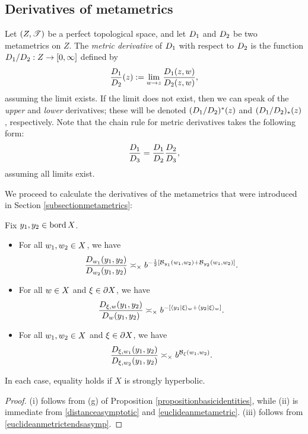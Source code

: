 \subsection{Derivatives of metametrics}

Let $(Z,\mathscr T)$ be a perfect topological space, and let $D_1$ and $D_2$ be two metametrics on $Z$. The \emph{metric derivative} of $D_1$ with respect to $D_2$ is the function $D_1/D_2:Z\to[0,\infty]$ defined by
\[
\frac{D_1}{D_2}(z) := \lim_{w\to z}\frac{D_1(z,w)}{D_2(z,w)},
\]
assuming the limit exists. If the limit does not exist, then we can speak of the \emph{upper} and \emph{lower} derivatives; these will be denoted $(D_1/D_2)^*(z)$ and $(D_1/D_2)_*(z)$, respectively. Note that the chain rule for metric derivatives takes the following form:
\[
\frac{D_1}{D_3} = \frac{D_1}{D_2}\frac{D_2}{D_3},
\]
assuming all limits exist.

We proceed to calculate the derivatives of the metametrics that were introduced in Section \ref{subsectionmetametrics}:

\begin{observation}
\label{observationGMVT}
Fix $y_1,y_2\in\operatorname{bord} X$.
\begin{itemize}
\item[(i)] For all $w_1,w_2\in X$, we have
\begin{equation}
\label{GMVT1}
\frac{D_{w_1}(y_1,y_2)}{D_{w_2}(y_1,y_2)} \asymp_\times b^{-\frac12[\operatorname{\mathcal B}_{y_1}(w_1,w_2) + \operatorname{\mathcal B}_{y_2}(w_1,w_2)]}.
\end{equation}
\item[(ii)] For all $w\in X$ and $\xi\in\partial X$, we have
\begin{equation}
\label{GMVT2}
\frac{D_{\xi,w}(y_1,y_2)}{D_w(y_1,y_2)} \asymp_\times b^{-[\langle y_1|\xi\rangle_w + \langle y_2|\xi\rangle_w]}.
\end{equation}
\item[(iii)] For all $w_1,w_2\in X$ and $\xi\in\partial X$, we have
\begin{equation}
\label{GMVT3}
\frac{D_{\xi,w_1}(y_1,y_2)}{D_{\xi,w_2}(y_1,y_2)} \asymp_\times b^{\operatorname{\mathcal B}_\xi(w_1,w_2)}.
\end{equation}
\end{itemize}
In each case, equality holds if $X$ is strongly hyperbolic.
\end{observation}
\begin{proof}
(i) follows from (g) of Proposition \ref{propositionbasicidentities}, while (ii) is immediate from \eqref{distanceasymptotic} and \eqref{euclideanmetametric}. (iii) follows from \eqref{euclideanmetrictendsasymp}.
\end{proof}

